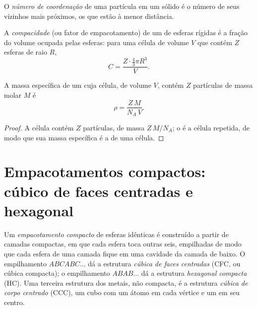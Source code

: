 \begin{definition}\label{def:b1:crystals-metals:coordination}
O \emph{número de coordenação} de uma partícula
em um sólido é o número de seus vizinhos mais próximos, os que estão à
menor distância.
\end{definition}

\begin{definition}[Compacidade]\label{def:b1:crystals-metals:compactness}
A \emph{compacidade} (ou fator de empacotamento) de
um  de esferas rígidas é a fração do volume ocupada pelas
esferas: para uma célula de volume $V$ que contém $Z$ esferas de raio $R$,
\[
  C = \frac{Z \cdot \frac43 \pi R^3}{V} .
\]
\end{definition}

\begin{proposition}\label{prop:b1:crystals-metals:density}
A massa específica de um  cuja célula, de volume $V$, contém $Z$
partículas de massa molar $M$ é
\[
  \rho = \frac{Z\,M}{N_A\,V} .
\]
\end{proposition}

\begin{proof}
A célula contém $Z$ partículas, de massa $Z\,M/N_A$; o  é a
célula repetida, de modo que sua massa específica é a de uma célula.
\end{proof}

\section{Empacotamentos compactos: cúbico de faces centradas e hexagonal}

\begin{definition}\label{def:b1:crystals-metals:packings}
Um \emph{empacotamento compacto} de esferas idênticas é
construído a partir de camadas compactas, em que cada esfera toca outras
seis, empilhadas de modo que cada esfera de uma camada fique em uma
cavidade da camada de baixo. O empilhamento $ABCABC\dots$ dá a estrutura
\emph{cúbica de faces centradas}
(CFC, ou cúbica compacta); o empilhamento $ABAB\dots$
dá a estrutura \emph{hexagonal compacta}
(HC). Uma terceira estrutura dos metais, não compacta, é a estrutura
\emph{cúbica de corpo centrado} (CCC), um
cubo com um átomo em cada vértice e um em seu centro.
\end{definition}

